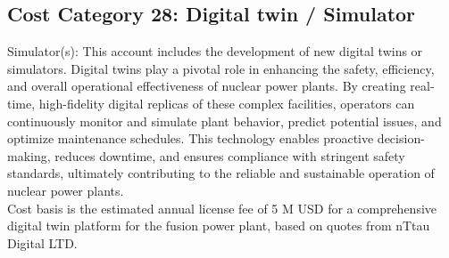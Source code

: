 \subsection{Cost Category 28: Digital twin / Simulator }

Simulator(s): This account includes the development of new digital twins or simulators.  Digital twins play a pivotal role in enhancing the safety, efficiency, and overall operational effectiveness of nuclear power plants. By creating real-time, high-fidelity digital replicas of these complex facilities, operators can continuously monitor and simulate plant behavior, predict potential issues, and optimize maintenance schedules. This technology enables proactive decision-making, reduces downtime, and ensures compliance with stringent safety standards, ultimately contributing to the reliable and sustainable 
operation of nuclear power plants.\\

Cost basis is the estimated annual license fee of 5 M USD for a comprehensive digital twin platform for the fusion power plant, based on quotes from nTtau Digital LTD.
